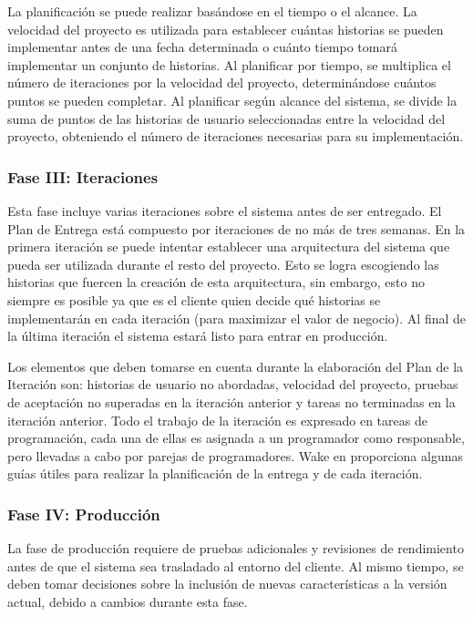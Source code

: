 	La planificación se puede realizar basándose en el tiempo o el alcance. La velocidad del proyecto es utilizada para establecer cuántas historias se pueden implementar antes de una fecha determinada o cuánto tiempo tomará implementar un conjunto de historias. Al planificar por tiempo, se multiplica el número de iteraciones por la velocidad del proyecto, determinándose cuántos puntos se pueden completar. Al planificar según alcance del sistema, se divide la suma de puntos de las historias de usuario seleccionadas entre la velocidad del proyecto, obteniendo el número de iteraciones necesarias para su implementación.	

\setlength{\parskip}{0mm}

\subsubsection{Fase III: Iteraciones}
\setlength{\parskip}{5mm}

	Esta fase incluye varias iteraciones sobre el sistema antes de ser entregado. El Plan de Entrega está compuesto por iteraciones de no más de tres semanas. En la primera iteración se puede intentar establecer una arquitectura del sistema que pueda ser utilizada durante el resto del proyecto. Esto se logra escogiendo las historias que fuercen la creación de esta arquitectura, sin embargo, esto no siempre es posible ya que es el cliente quien decide qué historias se implementarán en cada iteración (para maximizar el valor de negocio). Al final de la última iteración el sistema estará listo para entrar en producción.

	Los elementos que deben tomarse en cuenta durante la elaboración del Plan de la Iteración son: historias de usuario no abordadas, velocidad del proyecto, pruebas de aceptación no superadas en la iteración anterior y tareas no terminadas en la iteración anterior. Todo el trabajo de la iteración es expresado en tareas de programación, cada una de ellas es asignada a un programador como responsable, pero llevadas a cabo por parejas de programadores. Wake en proporciona algunas guías útiles para realizar la planificación de la entrega y de cada iteración.


\setlength{\parskip}{0mm}

\subsubsection{Fase IV: Producción}
\setlength{\parskip}{5mm}

	La fase de producción requiere de pruebas adicionales y revisiones de rendimiento antes de que el sistema sea trasladado al entorno del cliente. Al mismo tiempo, se deben tomar decisiones sobre la inclusión de nuevas características a la versión actual, debido a cambios durante esta fase.

